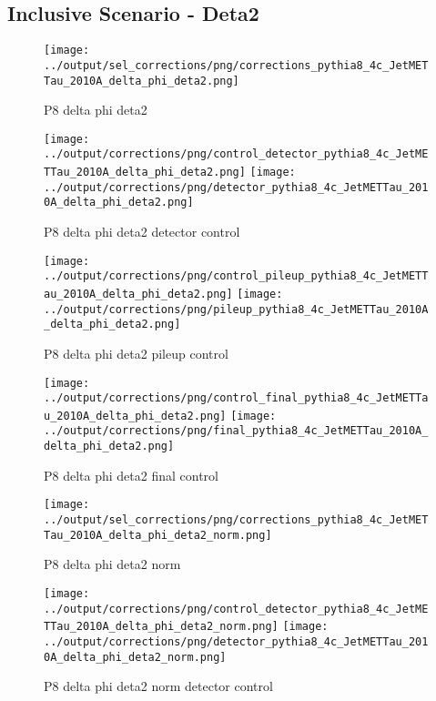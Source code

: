 \documentclass[11pt]{book}
\begin{document}
\clearpage
\subsection{Inclusive Scenario - Deta2}

\begin{figure}[ht]
\centering
\texttt{[image: ../output/sel\_corrections/png/corrections\_pythia8\_4c\_JetMETTau\_2010A\_delta\_phi\_deta2.png]}
\caption{P8 delta phi deta2}
\label{fig:p8_JetMETTau_2010A_delta_phi_deta2}
\end{figure}


\begin{figure}[ht]
\centering
\texttt{[image: ../output/corrections/png/control\_detector\_pythia8\_4c\_JetMETTau\_2010A\_delta\_phi\_deta2.png]}
\texttt{[image: ../output/corrections/png/detector\_pythia8\_4c\_JetMETTau\_2010A\_delta\_phi\_deta2.png]}
\caption{P8 delta phi deta2 detector control}
\label{fig:p8_JetMETTau_2010A_delta_phi_deta2_detector_control}
\end{figure}

\begin{figure}[ht]
\centering
\texttt{[image: ../output/corrections/png/control\_pileup\_pythia8\_4c\_JetMETTau\_2010A\_delta\_phi\_deta2.png]}
\texttt{[image: ../output/corrections/png/pileup\_pythia8\_4c\_JetMETTau\_2010A\_delta\_phi\_deta2.png]}
\caption{P8 delta phi deta2 pileup control}
\label{fig:p8_JetMETTau_2010A_delta_phi_deta2_pileup_control}
\end{figure}


\begin{figure}[ht]
\centering
\texttt{[image: ../output/corrections/png/control\_final\_pythia8\_4c\_JetMETTau\_2010A\_delta\_phi\_deta2.png]}
\texttt{[image: ../output/corrections/png/final\_pythia8\_4c\_JetMETTau\_2010A\_delta\_phi\_deta2.png]}
\caption{P8 delta phi deta2 final control}
\label{fig:p8_JetMETTau_2010A_delta_phi_deta2_final_control}
\end{figure}


\begin{figure}[ht]
\centering
\texttt{[image: ../output/sel\_corrections/png/corrections\_pythia8\_4c\_JetMETTau\_2010A\_delta\_phi\_deta2\_norm.png]}
\caption{P8 delta phi deta2 norm}
\label{fig:p8_JetMETTau_2010A_delta_phi_deta2_norm}
\end{figure}

\begin{figure}[ht]
\centering
\texttt{[image: ../output/corrections/png/control\_detector\_pythia8\_4c\_JetMETTau\_2010A\_delta\_phi\_deta2\_norm.png]}
\texttt{[image: ../output/corrections/png/detector\_pythia8\_4c\_JetMETTau\_2010A\_delta\_phi\_deta2\_norm.png]}
\caption{P8 delta phi deta2 norm detector control}
\label{fig:p8_JetMETTau_2010A_delta_phi_deta2_norm_detector_control}
\end{figure}
\end{document}
